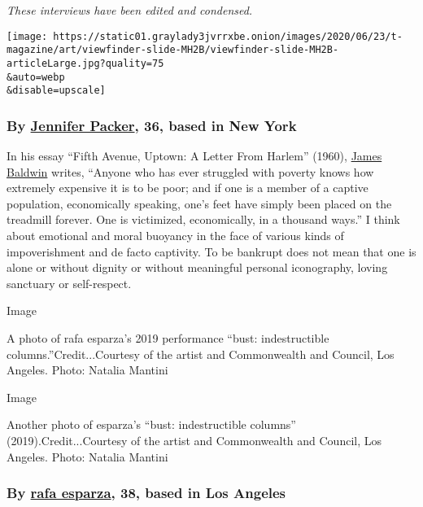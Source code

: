 \emph{These interviews have been edited and condensed.}

\texttt{[image: https://static01.graylady3jvrrxbe.onion/images/2020/06/23/t-magazine/art/viewfinder-slide-MH2B/viewfinder-slide-MH2B-articleLarge.jpg?quality=75\\\&auto=webp\\\&disable=upscale]}

\hypertarget{by-jennifer-packer-36-based-in-new-york}{%
\subsubsection{\texorpdfstring{\textbf{By}
\textbf{\href{https://www.sikkemajenkinsco.com/jennifer-packer}{Jennifer
Packer}, 36, based in New
York}}{By Jennifer Packer, 36, based in New York}}\label{by-jennifer-packer-36-based-in-new-york}}

In his essay ``Fifth Avenue, Uptown: A Letter From Harlem'' (1960),
\href{https://www.nytimes3xbfgragh.onion/2019/09/05/t-magazine/james-baldwin-giovannis-room.html}{James
Baldwin} writes, ``Anyone who has ever struggled with poverty knows how
extremely expensive it is to be poor; and if one is a member of a
captive population, economically speaking, one's feet have simply been
placed on the treadmill forever. One is victimized, economically, in a
thousand ways.'' I think about emotional and moral buoyancy in the face
of various kinds of impoverishment and de facto captivity. To be
bankrupt does not mean that one is alone or without dignity or without
meaningful personal iconography, loving sanctuary or self-respect.

Image

A photo of rafa esparza's 2019 performance ``bust: indestructible
columns.''Credit...Courtesy of the artist and Commonwealth and Council,
Los Angeles. Photo: Natalia Mantini

Image

Another photo of esparza's ``bust: indestructible columns''
(2019).Credit...Courtesy of the artist and Commonwealth and Council, Los
Angeles. Photo: Natalia Mantini

\hypertarget{by-rafa-esparza-38-based-in-los-angeles}{%
\subsubsection{\texorpdfstring{\textbf{By}
\textbf{\href{https://commonwealthandcouncil.com/us/rafa-esparza/biography}{rafa
esparza}, 38, based in Los
Angeles}}{By rafa esparza, 38, based in Los Angeles}}\label{by-rafa-esparza-38-based-in-los-angeles}}

